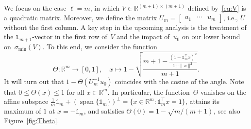 \documentclass[a4paper, reqno]{amsart}
\newcommand{\R}{\ensuremath{\mathbb R}}
\newcommand{\dd}{\ell}
\newcommand{\one}{\mathds{1}}
\begin{document}
We focus on the case $\dd=m$, in which $V \in \R^{(m+1)\times (m+1)}$ defined by~\eqref{eq:V} is a quadratic matrix. 
Moreover, we define the matrix $U_m = \begin{bmatrix} u_1 & \cdots & u_m \end{bmatrix}$, i.e., $U$ without the first column.  
A key step in the upcoming analysis is the treatment of the $\one_{m+1}$-vector in the first row of~$V$ and the impact of~$u_0$ on our lower bound on~$\sigma_\mathrm{min}(V)$. To this end, we consider the function
\begin{equation}
\label{eq:theta}
    \Theta : \R^m\to [0,1],\quad x \mapsto 1 - \sqrt{\frac{m+1 - \frac{(1-\one_m^\top x)^2}{1+\|x\|^2}}{m+1}}.
\end{equation}
It will turn out that $1-\Theta(U_m^{-1}u_0)$ coincides with the cosine of the angle. 
Note that $0\le\Theta(x)\le 1$ for all $x\in\R^m$. In particular, the function~$\Theta$ vanishes on the affine subspace $\tfrac 1m\one_m + (\operatorname{span}\{\one_m\})^\perp = \{x\in\R^m : \one_m^\top x = 1\}$, attains its maximum of $1$ at $x=-\one_m$, and satisfies $\Theta(0) = 1 - \sqrt{m/(m+1)}$, see also Figure~\ref{fig:Theta}.
\end{document}
